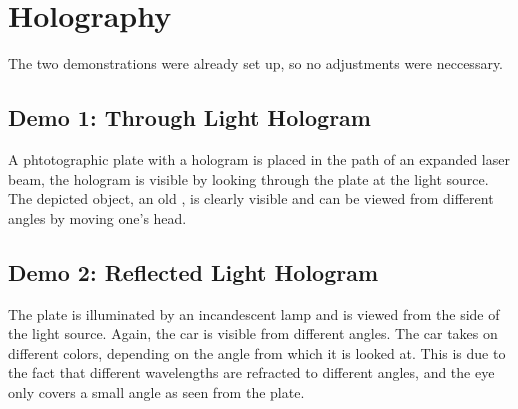 \chapter{Holography}
The two demonstrations were already set up, so no adjustments were neccessary.

\section*{Demo 1: Through Light Hologram}
A phtotographic plate with a hologram is placed in the path of an expanded laser beam, the hologram is visible by looking through the plate at the light source.
The depicted object, an old , is clearly visible and can be viewed from different angles by moving one's head.

\section*{Demo 2: Reflected Light Hologram}
The plate is illuminated by an incandescent lamp and is viewed from the side of the light source.
Again, the car is visible from different angles.
The car takes on different colors, depending on the angle from which it is looked at.
This is due to the fact that different wavelengths are refracted to different angles, and the eye only covers a small angle as seen from the plate.
